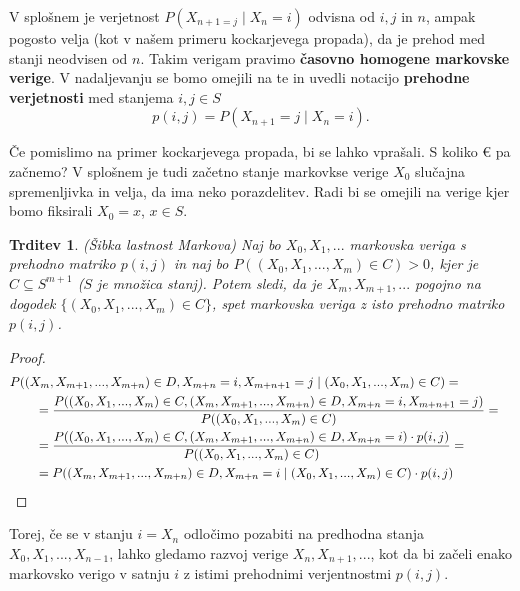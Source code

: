 \documentclass[a4paper,12pt]{article}
\newtheorem{trditev}[izrek]{Trditev}
\begin{document}
V splošnem je verjetnost $P(X_{n+1=j} \mid X_n = i)$ odvisna od $i,j$ in $n$, ampak pogosto velja (kot v našem primeru kockarjevega propada),
da je prehod med stanji neodvisen od $n$. Takim verigam pravimo \textbf{časovno homogene markovske verige}. V nadaljevanju se 
bomo omejili na te in uvedli notacijo \textbf{prehodne verjetnosti} med stanjema $i,j \in S$
$$p(i,j) = P(X_{n+1}=j \mid X_n = i).$$

Če pomislimo na primer kockarjevega propada, bi se lahko vprašali. S koliko € pa začnemo? V splošnem je tudi začetno stanje 
markovkse verige $X_0$ slučajna spremenljivka in velja, da ima neko porazdelitev. Radi bi se omejili na verige kjer 
bomo fiksirali $X_0 = x$, $x \in S$.

\begin{trditev}(Šibka lastnost Markova)
    Naj bo $ X_{0}, X_{1}, ... $ markovska veriga 
    s prehodno matriko $p{(i,j)}$ in naj bo  $ P((X_0, X_1, ..., X_m) \in C) > 0$, kjer je $C \subseteq S^{m+1}$ ($S$ je množica stanj). 
    Potem sledi, da je $X_m, X_{m+1}, ...$ pogojno na dogodek $\{(X_0, X_1, ...,X_m) \in C \}$, %
    spet markovska veriga z isto prehodno matriko $p{(i,j)}$.
\end{trditev}

\begin{proof}
    \begin{align*}
        \lefteqn{P((X_m, X_{m+1}, ..., X_{m+n}) \in D, \space X_{m+n}=i,\space X_{m+n+1}=j \mid (X_0, X_1, ..., X_m) \in C)=} \qquad
       \\&=\frac{P((X_0, X_1, ..., X_m) \in C, \space (X_m, X_{m+1}, ..., X_{m+n}) \in D, \space X_{m+n}=i, \space X_{m+n+1}=j)}{P((X_0, X_1, ..., X_m) \in C)}=
        \\&=\frac{P((X_0, X_1, ..., X_m) \in C, \space (X_m, X_{m+1}, ..., X_{m+n}) \in D, \space X_{m+n}=i) \cdot p{(i,j)}}{P((X_0, X_1, ..., X_m) \in C)}=
        \\&=P((X_m, X_{m+1}, ..., X_{m+n}) \in D, \space X_{m+n}=i\mid (X_0, X_1, ..., X_m) \in C) \cdot p{(i,j)}
    \end{align*}
\end{proof}

Torej, če se v stanju $i = X_n$ odločimo pozabiti na predhodna stanja $X_0, X_1, ..., X_{n-1}$, lahko gledamo razvoj verige $X_n, X_{n+1}, ...$, kot da bi 
začeli enako markovsko verigo v satnju $i$ z istimi prehodnimi verjentnostmi $p(i,j)$.
\end{document}
